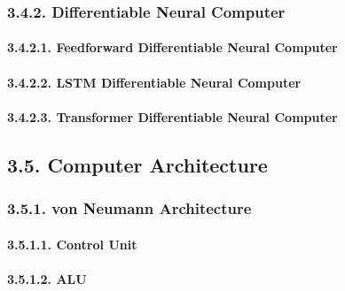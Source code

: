\documentclass[
]{article}
\begin{document}
\hypertarget{differentiable-neural-computer}{%
\subsubsection{3.4.2. Differentiable Neural
Computer}\label{differentiable-neural-computer}}

\hypertarget{feedforward-differentiable-neural-computer}{%
\paragraph{3.4.2.1. Feedforward Differentiable Neural
Computer}\label{feedforward-differentiable-neural-computer}}

\hypertarget{lstm-differentiable-neural-computer}{%
\paragraph{3.4.2.2. LSTM Differentiable Neural
Computer}\label{lstm-differentiable-neural-computer}}

\hypertarget{transformer-differentiable-neural-computer}{%
\paragraph{3.4.2.3. Transformer Differentiable Neural
Computer}\label{transformer-differentiable-neural-computer}}

\hypertarget{computer-architecture}{%
\subsection{3.5. Computer Architecture}\label{computer-architecture}}

\hypertarget{von-neumann-architecture}{%
\subsubsection{3.5.1. von Neumann
Architecture}\label{von-neumann-architecture}}

\hypertarget{control-unit}{%
\paragraph{3.5.1.1. Control Unit}\label{control-unit}}

\hypertarget{alu}{%
\paragraph{3.5.1.2. ALU}\label{alu}}
\end{document}
